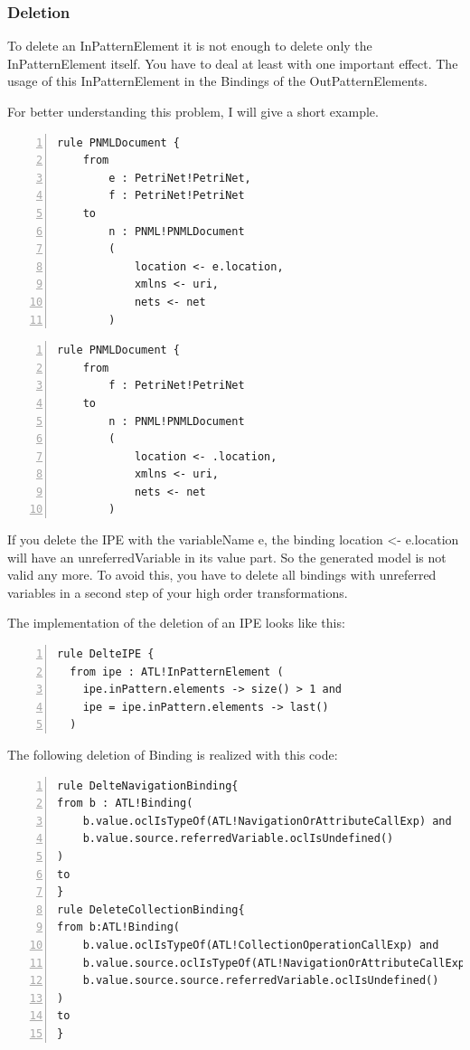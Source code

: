\documentclass{llncs}
\begin{document}
\subsubsection{Deletion}

To delete an InPatternElement it is not enough to delete only the InPatternElement itself. You have to deal at least with one important effect. The usage of this InPatternElement in the Bindings of the OutPatternElements.

For better understanding this problem, I will give a short example.

\begin{lstlisting}[language=ATL, numbers=left,xleftmargin=5.0ex]
rule PNMLDocument {
	from
		e : PetriNet!PetriNet,
		f : PetriNet!PetriNet
	to	
		n : PNML!PNMLDocument
		(
			location <- e.location,
			xmlns <- uri,
			nets <- net			
		)
\end{lstlisting}

\begin{lstlisting}[language=ATL, numbers=left,xleftmargin=5.0ex]
rule PNMLDocument {
	from
		f : PetriNet!PetriNet
	to	
		n : PNML!PNMLDocument
		(
			location <- .location,
			xmlns <- uri,
			nets <- net			
		)
\end{lstlisting}

If you delete the IPE with the variableName e, the binding location <- e.location will have an unreferredVariable in its value part. So the generated model is not valid any more. To avoid this, you have to delete all bindings with unreferred variables in a second step of your high order transformations.

The implementation of the deletion of an IPE looks like this:
\begin{lstlisting}[language=ATL, numbers=left,xleftmargin=5.0ex]
rule DelteIPE {
  from ipe : ATL!InPatternElement (
    ipe.inPattern.elements -> size() > 1 and
    ipe = ipe.inPattern.elements -> last()
  )
\end{lstlisting}

The following deletion of Binding is realized with this code:
\begin{lstlisting}[language=ATL, numbers=left,xleftmargin=5.0ex]
rule DelteNavigationBinding{
from b : ATL!Binding(
	b.value.oclIsTypeOf(ATL!NavigationOrAttributeCallExp) and 
	b.value.source.referredVariable.oclIsUndefined()
)
to
}
rule DeleteCollectionBinding{
from b:ATL!Binding(		
	b.value.oclIsTypeOf(ATL!CollectionOperationCallExp) and 
	b.value.source.oclIsTypeOf(ATL!NavigationOrAttributeCallExp) and 
	b.value.source.source.referredVariable.oclIsUndefined()
)
to
}
\end{lstlisting}
\end{document}
